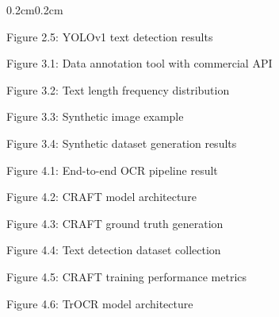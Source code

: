 \begin{adjustwidth}{0.2cm}{0.2cm}
    {\large Figure 2.5: YOLOv1 text detection results\dotfill\pageref{fig:single_language_only}\hspace{0.1cm}\par}
    
    {\large Figure 3.1: Data annotation tool with commercial API\dotfill\pageref{fig:data_annotation_tool}\hspace{0.1cm}\par}
    
    {\large Figure 3.2: Text length frequency distribution\dotfill\pageref{fig:frequency_of_text_length}\hspace{0.1cm}\par}
    
    {\large Figure 3.3: Synthetic image example\dotfill\pageref{fig:synthetic-image}\hspace{0.1cm}\par}
    
    {\large Figure 3.4: Synthetic dataset generation results\dotfill\pageref{fig:result_synthetic_dataset}\hspace{0.1cm}\par}
    
    {\large Figure 4.1: End-to-end OCR pipeline result\dotfill\pageref{fig:result_converted}\hspace{0.1cm}\par}
    
    {\large Figure 4.2: CRAFT model architecture\dotfill\pageref{fig:craft-model}\hspace{0.1cm}\par}
    
    {\large Figure 4.3: CRAFT ground truth generation\dotfill\pageref{fig:craft-model-architecture-detailed}\hspace{0.1cm}\par}
    
    {\large Figure 4.4: Text detection dataset collection\dotfill\pageref{fig:data_craft_collection}\hspace{0.1cm}\par}
    
    {\large Figure 4.5: CRAFT training performance metrics\dotfill\pageref{fig:iou-recall-craft}\hspace{0.1cm}\par}
    
    {\large Figure 4.6: TrOCR model architecture\dotfill\pageref{fig:trocr-model}\hspace{0.1cm}\par}
    

\end{adjustwidth}

